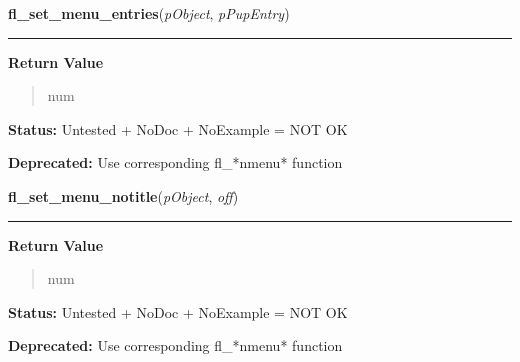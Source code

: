     \label{xformslib:deprecated:fl_set_menu_entries}

    \vspace{0.5ex}

\hspace{.8\funcindent}\begin{boxedminipage}{\funcwidth}

    \raggedright \textbf{fl\_set\_menu\_entries}(\textit{pObject}, \textit{pPupEntry})

    \vspace{-1.5ex}

    \rule{\textwidth}{0.5\fboxrule}
\setlength{\parskip}{2ex}
\setlength{\parskip}{1ex}
      \textbf{Return Value}
    \vspace{-1ex}

      \begin{quote}
      num

      \end{quote}

\textbf{Status:} Untested + NoDoc + NoExample = NOT OK



\textbf{Deprecated:} Use corresponding fl\_*nmenu* function



    \end{boxedminipage}

    \label{xformslib:deprecated:fl_set_menu_notitle}

    \vspace{0.5ex}

\hspace{.8\funcindent}\begin{boxedminipage}{\funcwidth}

    \raggedright \textbf{fl\_set\_menu\_notitle}(\textit{pObject}, \textit{off})

    \vspace{-1.5ex}

    \rule{\textwidth}{0.5\fboxrule}
\setlength{\parskip}{2ex}
\setlength{\parskip}{1ex}
      \textbf{Return Value}
    \vspace{-1ex}

      \begin{quote}
      num

      \end{quote}

\textbf{Status:} Untested + NoDoc + NoExample = NOT OK



\textbf{Deprecated:} Use corresponding fl\_*nmenu* function



    \end{boxedminipage}

